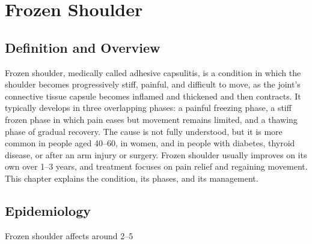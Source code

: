 \chapter{Frozen Shoulder}

\section*{Definition and Overview}
Frozen shoulder, medically called adhesive capsulitis, is a condition in which the shoulder becomes progressively stiff, painful, and difficult to move, as the joint's connective tissue capsule becomes inflamed and thickened and then contracts. It typically develops in three overlapping phases: a painful freezing phase, a stiff frozen phase in which pain eases but movement remains limited, and a thawing phase of gradual recovery. The cause is not fully understood, but it is more common in people aged 40--60, in women, and in people with diabetes, thyroid disease, or after an arm injury or surgery. Frozen shoulder usually improves on its own over 1--3 years, and treatment focuses on pain relief and regaining movement. This chapter explains the condition, its phases, and its management.

\section*{Epidemiology}
Frozen shoulder affects around 2--5%

